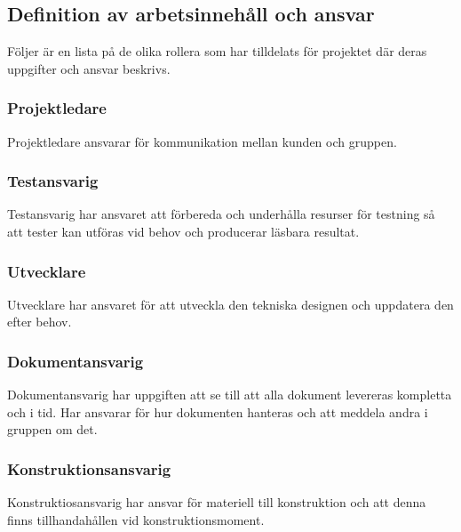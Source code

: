 \documentclass[10pt,oneside,swedish]{lips}
\begin{document}
\subsection{Definition av arbetsinnehåll och ansvar}
Följer är en lista på de olika rollera som har tilldelats för projektet där deras uppgifter och ansvar beskrivs.

\subsubsection{Projektledare}
Projektledare ansvarar för kommunikation mellan kunden och gruppen.

\subsubsection{Testansvarig}
Testansvarig har ansvaret att förbereda och underhålla resurser för testning så att tester kan utföras vid behov och producerar läsbara resultat.  

\subsubsection{Utvecklare}
Utvecklare har ansvaret för att utveckla den tekniska designen och uppdatera den efter behov. 

\subsubsection{Dokumentansvarig}
Dokumentansvarig har uppgiften att se till att alla dokument levereras kompletta och i tid. Har ansvarar för hur dokumenten hanteras och att meddela andra i gruppen om det.

\subsubsection{Konstruktionsansvarig}
Konstruktiosansvarig har ansvar för materiell till konstruktion och att denna finns tillhandahållen vid konstruktionsmoment.

\pagebreak
\end{document}
